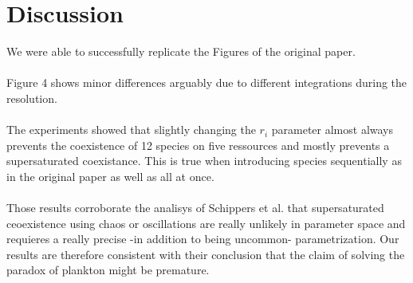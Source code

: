 \section{Discussion}
We were able to successfully replicate the Figures of the original paper.\\ 
\\
Figure 4 shows minor differences arguably due to different integrations during 
the resolution.\\
\\
The experiments showed that slightly changing the $r_i$ parameter almost always 
prevents the coexistence of 12 species on five ressources and mostly prevents a 
supersaturated coexistance. This is true when introducing species sequentially 
as in the original paper as well as all at once. \\
\\
Those results corroborate the analisys of Schippers et 
al.\supercite{2008:Schippers} that supersaturated ceoexistence using chaos or 
oscillations are really unlikely in parameter space and requieres a really 
precise -in addition to being uncommon- parametrization. Our results are 
therefore consistent with their conclusion that the claim of solving the paradox 
of plankton might be premature.


